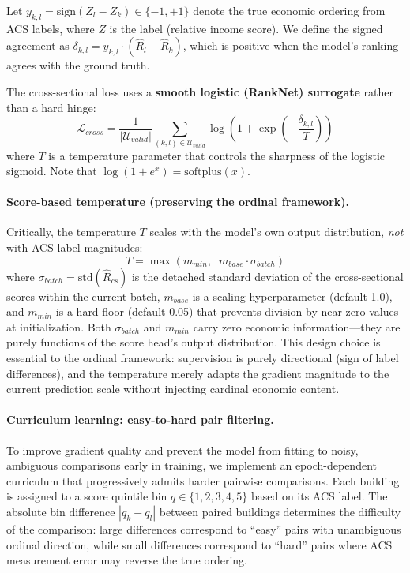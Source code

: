 \documentclass{article}
\begin{document}
Let $y_{k,l} = \text{sign}(Z_l - Z_k) \in \{-1, +1\}$ denote the true economic ordering from ACS labels, where $Z$ is the label (relative income score). We define the signed agreement as $\delta_{k,l} = y_{k,l} \cdot (\hat{R}_l - \hat{R}_k)$, which is positive when the model's ranking agrees with the ground truth.

The cross-sectional loss uses a \textbf{smooth logistic (RankNet) surrogate} rather than a hard hinge:
\begin{equation}
\mathcal{L}_{cross} = \frac{1}{|\mathcal{U}_{valid}|} \sum_{(k,l) \in \mathcal{U}_{valid}} \log\!\left(1 + \exp\!\left(-\frac{\delta_{k,l}}{T}\right)\right)
\end{equation}
where $T$ is a temperature parameter that controls the sharpness of the logistic sigmoid. Note that $\log(1 + e^x) = \text{softplus}(x)$.

\paragraph{Score-based temperature (preserving the ordinal framework).}
Critically, the temperature $T$ scales with the model's own output distribution, \textit{not} with ACS label magnitudes:
\begin{equation}
T = \max\!\left(m_{min},\;\; m_{base} \cdot \sigma_{batch}\right)
\end{equation}
where $\sigma_{batch} = \text{std}(\hat{R}_{cs})$ is the detached standard deviation of the cross-sectional scores within the current batch, $m_{base}$ is a scaling hyperparameter (default 1.0), and $m_{min}$ is a hard floor (default 0.05) that prevents division by near-zero values at initialization. Both $\sigma_{batch}$ and $m_{min}$ carry zero economic information---they are purely functions of the score head's output distribution. This design choice is essential to the ordinal framework: supervision is purely directional (sign of label differences), and the temperature merely adapts the gradient magnitude to the current prediction scale without injecting cardinal economic content.

\paragraph{Curriculum learning: easy-to-hard pair filtering.}
To improve gradient quality and prevent the model from fitting to noisy, ambiguous comparisons early in training, we implement an epoch-dependent curriculum that progressively admits harder pairwise comparisons. Each building is assigned to a score quintile bin $q \in \{1, 2, 3, 4, 5\}$ based on its ACS label. The absolute bin difference $|q_k - q_l|$ between paired buildings determines the difficulty of the comparison: large differences correspond to ``easy'' pairs with unambiguous ordinal direction, while small differences correspond to ``hard'' pairs where ACS measurement error may reverse the true ordering.
\end{document}
